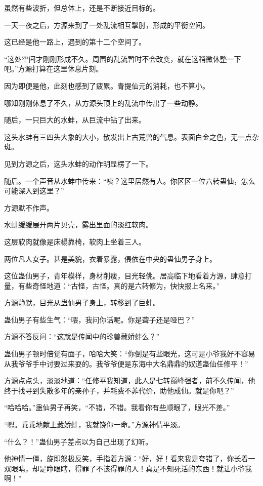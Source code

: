 \begin{this_body}
虽然有些波折，但总体上，还是不断接近目标的。

一天一夜之后，方源来到了一处乱流相互掣肘，形成的平衡空间。

这已经是他一路上，遇到的第十二个空间了。

“这处空间才刚刚形成不久。周围的乱流暂时不会改变，就在这稍微休整一下吧。”方源打算在这里休息片刻。

因为即便是他，此刻也感到了疲累。青提仙元的消耗，也不算小。

哪知刚刚休息了不久，从方源头顶上的乱流中传出了一些动静。

随后，一只巨大的水蚌，从巨流中钻了出来。

这头水蚌有三四头大象的大小，散发出上古荒兽的气息。表面白金之色，无一点杂斑。

见到方源之后，这头水蚌的动作明显楞了一下。

随后。一个声音从水蚌中传来：“咦？这里居然有人。你区区一位六转蛊仙，怎么可能深入到这里？”

方源默不作声。

水蚌缓缓展开两片贝壳，露出里面的淡红软肉。

这层软肉就像是床榻靠椅，软肉上坐着三人。

两位凡人女子。甚是美貌，衣着暴露，偎依在中央的蛊仙男子身上。

这位蛊仙男子，青年模样，身材削瘦，目光轻佻。居高临下地看着方源，肆意打量，有些奇怪地道：“古怪，古怪。真的是六转修为，快快报上名来。”

方源静默，目光从蛊仙男子身上，转移到了巨蚌。

蛊仙男子有些生气：“喂，我问你话呢。你是聋子还是哑巴？”

方源不答反问：“这就是传闻中的珍兽藏娇蚌么？”

蛊仙男子顿时倍觉有面子，哈哈大笑：“你倒是有些眼光，这可是小爷我好不容易从我爷爷手中讨要过来耍的。我爷爷便是东海中大名鼎鼎的奴道蛊仙任修平！”

方源点点头，淡淡地道：“任修平我知道，此人是七转巅峰强者，前不久传闻，他终于找寻到失散多年的亲孙子，并耗费不菲代价，助他成仙。就是你吧？”

“哈哈哈。”蛊仙男子再笑，“不错，不错。我看你有些顺眼了，眼光不差。”

“嗯。乖乖地献上藏娇蚌，我就饶你一命。”方源神情平淡。

“什么？！”蛊仙男子差点以为自己出现了幻听。

他神情一僵，旋即怒极反笑，手指着方源：“好，好！看来我是夸错了，你长着一双眼睛，却是睁眼瞎，得罪了不该得罪的人！真是不知死活的东西！就让小爷我啊！”


\end{this_body}
